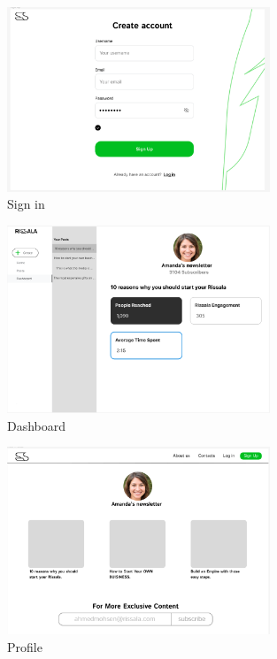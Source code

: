 \begin{figure}
    \centering
    \includegraphics[width=0.7\textwidth,height=1\textheight,keepaspectratio]{interfaces/sign up.png}
    \caption{Sign in}
    \label{fig:diagramme}
\end{figure}
\begin{figure}
    \centering
    \includegraphics[width=0.7\textwidth,height=1\textheight,keepaspectratio]{interfaces/Dashboard.png}
    \caption{Dashboard}
    \label{fig:diagramme}
\end{figure}
\begin{figure}
    \centering
    \includegraphics[width=0.7\textwidth,height=1\textheight,keepaspectratio]{interfaces/user profile.png}
    \caption{Profile}
    \label{fig:diagramme}
\end{figure}
